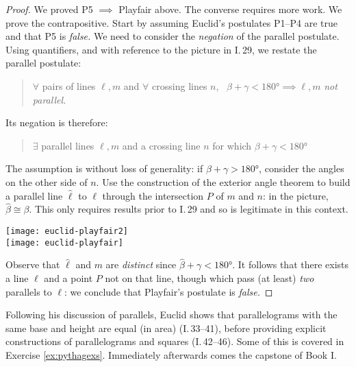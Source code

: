 \begin{proof}
We proved P5 $\implies$ Playfair above. The converse requires more work.\medbreak
We prove the contrapositive. Start by assuming Euclid's postulates P1--P4 are true and that P5 is \emph{false.} We need to consider the \emph{negation} of the parallel postulate. Using quantifiers, and with reference to the picture in I.\,29, we restate the parallel postulate:
	\begin{quote}
  	$\forall$ pairs of lines $\ell,m$ and $\forall$ crossing lines $n$, \  $\beta+\gamma<\ang{180}\implies\ell,m$ \emph{not parallel.}
	\end{quote}
	\begin{minipage}[t]{0.62\linewidth}\vspace{-7pt}
	Its negation is therefore:
	\begin{quote}
  	$\exists$ parallel lines $\ell,m$ and a crossing line $n$ for which $\beta+\gamma<\ang{180}$
	\end{quote}
	The assumption is without loss of generality: if $\beta+\gamma>\ang{180}$, consider the angles on the other side of $n$.\medbreak
	Use the construction of the exterior angle theorem to build a parallel line $\hat\ell$ to $\ell$ through the intersection $P$ of $m$ and $n$: in the picture, $\hat\beta\cong\beta$. This only requires results prior to I.\,29 and so is legitimate in this context.
\end{minipage}\hfill
\begin{minipage}[t]{0.37\linewidth}\vspace{0pt}
\flushright\texttt{[image: euclid-playfair2]}\\
\flushright\texttt{[image: euclid-playfair]}
\end{minipage}\medbreak
Observe that $\hat\ell$ and $m$ are \emph{distinct} since $\hat\beta+\gamma<\ang{180}$.
It follows that there exists a line $\ell$ and a point $P$ not on that line, though which pass (at least) \emph{two} parallels to $\ell$: we conclude that Playfair's postulate is \emph{false.}
\end{proof}

\goodbreak



Following his discussion of parallels, Euclid shows that parallelograms with the same base and height are equal (in area) (I.\,33--41), before providing explicit constructions of parallelograms and squares (I.\,42--46). Some of this is covered in Exercise \ref{ex:pythagexs}. Immediately afterwards comes the capstone of Book I.


